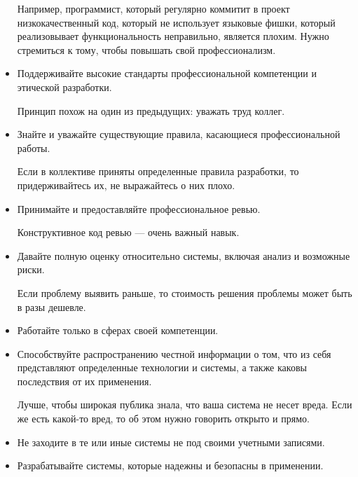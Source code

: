 \begin{Rem}
\begin{itemize}
            Например, программист, который регулярно коммитит в проект низкокачественный код, который не использует языковые фишки, который реализовывает функциональность неправильно, является плохим. Нужно стремиться к тому, чтобы повышать свой профессионализм.

            \item Поддерживайте высокие стандарты профессиональной компетенции и этической разработки.

            Принцип похож на один из предыдущих: уважать труд коллег.

            \item Знайте и уважайте существующие правила, касающиеся профессиональной работы.

            Если в коллективе приняты определенные правила разработки, то придерживайтесь их, не выражайтесь о них плохо.

            \item Принимайте и предоставляйте профессиональное ревью.

            Конструктивное код ревью --- очень важный навык.

            \item Давайте полную оценку относительно системы, включая анализ и возможные риски.

            Если проблему выявить раньше, то стоимость решения проблемы может быть в разы дешевле.

            \item Работайте только в сферах своей компетенции.

            \item Способствуйте распространению честной информации о том, что из себя представляют определенные технологии и системы, а также каковы последствия от их применения.

            Лучше, чтобы широкая публика знала, что ваша система не несет вреда. Если же есть какой-то вред, то об этом нужно говорить открыто и прямо.

            \item Не заходите в те или иные системы не под своими учетными записями.

            \item Разрабатывайте системы, которые надежны и безопасны в применении.
        \end{itemize}
    \end{Rem}


